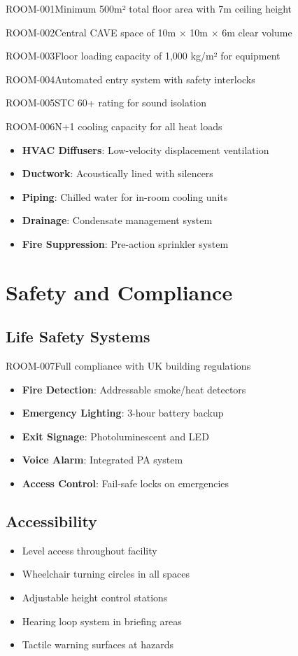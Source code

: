 \begin{requirement}{ROOM-001}{Minimum 500m² total floor area with 7m ceiling height}
\begin{requirement}{ROOM-002}{Central CAVE space of 10m × 10m × 6m clear volume}
\begin{requirement}{ROOM-003}{Floor loading capacity of 1,000 kg/m² for equipment}
\begin{requirement}{ROOM-004}{Automated entry system with safety interlocks}
\begin{requirement}{ROOM-005}{STC 60+ rating for sound isolation}
\begin{requirement}{ROOM-006}{N+1 cooling capacity for all heat loads}
\begin{itemize}
    \item \textbf{HVAC Diffusers}: Low-velocity displacement ventilation
    \item \textbf{Ductwork}: Acoustically lined with silencers
    \item \textbf{Piping}: Chilled water for in-room cooling units
    \item \textbf{Drainage}: Condensate management system
    \item \textbf{Fire Suppression}: Pre-action sprinkler system
\end{itemize}

\section{Safety and Compliance}

\subsection{Life Safety Systems}

\begin{requirement}{ROOM-007}{Full compliance with UK building regulations}

\begin{itemize}
    \item \textbf{Fire Detection}: Addressable smoke/heat detectors
    \item \textbf{Emergency Lighting}: 3-hour battery backup
    \item \textbf{Exit Signage}: Photoluminescent and LED
    \item \textbf{Voice Alarm}: Integrated PA system
    \item \textbf{Access Control}: Fail-safe locks on emergencies
\end{itemize}

\subsection{Accessibility}

\begin{itemize}
    \item Level access throughout facility
    \item Wheelchair turning circles in all spaces
    \item Adjustable height control stations
    \item Hearing loop system in briefing areas
    \item Tactile warning surfaces at hazards
\end{itemize}


\end{requirement}
\end{requirement}
\end{requirement}
\end{requirement}
\end{requirement}
\end{requirement}
\end{requirement}
